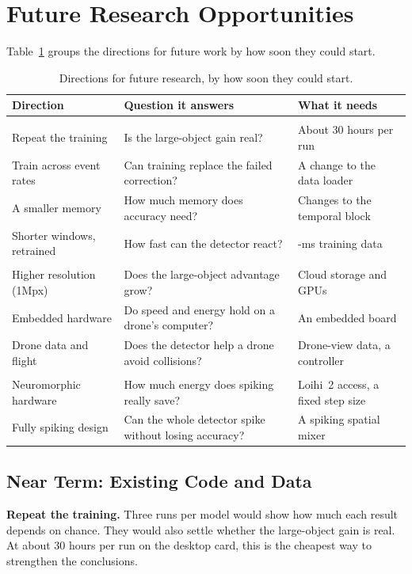 \documentclass[11pt, a4paper]{report}
\begin{document}
\section{Future Research Opportunities}
\label{sec:future_work}
Table~\ref{tab:future} groups the directions for future work by how soon they could start.

\begin{table}[htbp]
\centering
\small
\caption[Directions for future research]{Directions for future research, by how soon they could start.}
\label{tab:future}
\begin{tabularx}{\textwidth}{@{}>{\raggedright\arraybackslash}p{3.6cm}>{\raggedright\arraybackslash}X>{\raggedright\arraybackslash}X@{}}
\toprule
\textbf{Direction} & \textbf{Question it answers} & \textbf{What it needs} \\
\midrule
\multicolumn{3}{@{}l}{\textbf{Near term}} \\
Repeat the training & Is the large-object gain real? & About 30 hours per run \\
Train across event rates & Can training replace the failed correction? & A change to the data loader \\
A smaller memory & How much memory does accuracy need? & Changes to the temporal block \\
Shorter windows, retrained & How fast can the detector react? & 5-ms training data \\
\midrule
\multicolumn{3}{@{}l}{\textbf{Medium term}} \\
Higher resolution (1Mpx) & Does the large-object advantage grow? & Cloud storage and GPUs \\
Embedded hardware & Do speed and energy hold on a drone's computer? & An embedded board \\
Drone data and flight & Does the detector help a drone avoid collisions? & Drone-view data, a controller \\
\midrule
\multicolumn{3}{@{}l}{\textbf{Long term}} \\
Neuromorphic hardware & How much energy does spiking really save? & Loihi~2 access, a fixed step size \\
Fully spiking design & Can the whole detector spike without losing accuracy? & A spiking spatial mixer \\
\bottomrule
\end{tabularx}
\end{table}

\subsection{Near Term: Existing Code and Data}
\textbf{Repeat the training.} Three runs per model would show how much each result depends on chance. They
would also settle whether the large-object gain is real. At about 30 hours per run on the desktop card, this
is the cheapest way to strengthen the conclusions.
\end{document}

